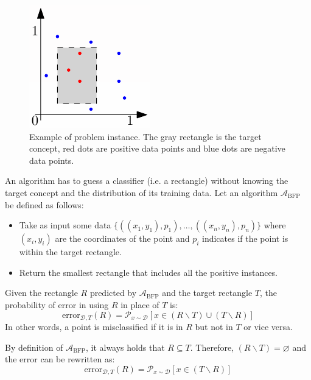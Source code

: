 \begin{figure}[H]
    \centering
    \includegraphics[width=0.2\linewidth]{./img/_learning_rectangle.pdf}
    \caption{Example of problem instance. The gray rectangle is the target concept, red dots are positive data points and blue dots are negative data points.}
\end{figure}

An algorithm has to guess a classifier (i.e. a rectangle) without knowing the target concept and the distribution of its training data.
Let an algorithm $\mathcal{A}_\text{BFP}$ be defined as follows:
\begin{itemize}
    \item Take as input some data $\{ ((x_1, y_1), p_1), \dots, ((x_n, y_n), p_n) \}$ where 
        $(x_i, y_i)$ are the coordinates of the point and $p_i$ indicates if the point is within the target rectangle.
    \item Return the smallest rectangle that includes all the positive instances.
\end{itemize}

Given the rectangle $R$ predicted by $\mathcal{A}_\text{BFP}$ and the target rectangle $T$,
the probability of error in using $R$ in place of $T$ is:
\[ \text{error}_{\mathcal{D}, T}(R) = \mathcal{P}_{x \sim \mathcal{D}} [ x \in (R \smallsetminus T) \cup (T \smallsetminus R) ] \]
In other words, a point is misclassified if it is in $R$ but not in $T$ or vice versa.
\begin{remark}
    By definition of $\mathcal{A}_\text{BFP}$, it always holds that $R \subseteq T$. 
    Therefore, $(R \smallsetminus T) = \varnothing$ and the error can be rewritten as:
    \[ \text{error}_{\mathcal{D}, T}(R) = \mathcal{P}_{x \sim \mathcal{D}} [ x \in (T \smallsetminus R) ] \]
\end{remark}


